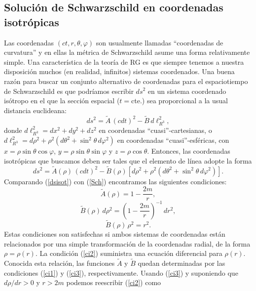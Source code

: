 \subsection{Solución de Schwarzschild en coordenadas isotrópicas}

Las coordenadas $(ct,r,\theta,\varphi)$ son usualmente llamadas ``coordenadas de curvatura'' y en ellas la métrica de Schwarzschild asume una forma relativamente simple.
Una característica de la teoría de RG es que siempre tenemos a
nuestra disposición muchos (en realidad, infinitos) sistemas coordenados. Una
buena razón para buscar un conjunto alternativo de coordenadas para el espaciotiempo de Schwarzschild es que podríamos escribir $ds^2$ en un sistema coordenado isótropo en el que la sección espacial ($t=$cte.) sea proporcional a la usual distancia euclideana:
\begin{equation}
ds^2=\tilde{A}\,(cdt)^2-\tilde{B}\,d\ell^2_{R^3} ,
\end{equation}
donde $d\ell^2_{R^3}=dx^2+dy^2+dz^2$ en coordenadas ``cuasi''-cartesianas, o
$d\ell^2_{R^3}=d\rho^2+\rho^2(d\theta^2+\sin^2\theta\,d\varphi^2)$ en coordenadas
``cuasi''-esféricas, con $x=\rho\sin\theta\cos\varphi$, $y=\rho\sin\theta\sin\varphi$ y $z=\rho\cos\theta$.
Entonces, las coordenadas isotrópicas que buscamos deben ser tales que el elemento de línea adopte la forma
\begin{equation}
ds^2=\tilde{A}(\rho)\,(cdt)^2-\tilde{B}(\rho)\left[d\rho^2+\rho^2(d\theta^2+\sin^2\theta\,d\varphi^2)\right] .\label{dsisot}
\end{equation}
Comparando (\ref{dsisot}) con (\ref{Sch}) encontramos las siguientes condiciones:
\begin{equation}
 \tilde{A}(\rho)=1-\frac{2m}{r}, \label{ci1}
\end{equation}
\begin{equation}
 \tilde{B}(\rho)\,d\rho^2=\left(1-\frac{2m}{r}\right)^{-1}\,dr^2, \label{ci2}
\end{equation}
\begin{equation}
 \tilde{B}(\rho)\,\rho^2=r^2. \label{ci3}
\end{equation}
Estas condiciones son satisfechas si ambos sistemas de coordenadas están relacionados por una simple transformación de la coordenadas radial, de la forma $\rho=\rho(r)$. La condición (\ref{ci2}) suministra una ecuación diferencial para $\rho(r)$. Conocida esta relación, las funciones $\tilde{A}$ y $\tilde{B}$ quedan determinadas por las condiciones (\ref{ci1}) y (\ref{ci3}), respectivamente. Usando (\ref{ci3}) y suponiendo que $d\rho/dr>0$ y $r>2m$ podemos reescribir (\ref{ci2}) como
